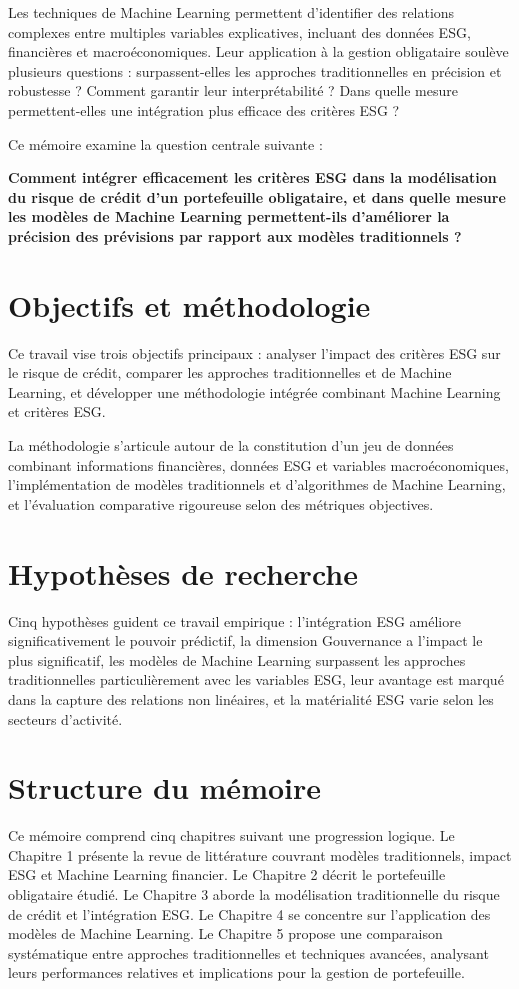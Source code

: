 Les techniques de Machine Learning permettent d'identifier des relations complexes entre multiples variables explicatives, incluant des données ESG, financières et macroéconomiques. Leur application à la gestion obligataire soulève plusieurs questions : surpassent-elles les approches traditionnelles en précision et robustesse ? Comment garantir leur interprétabilité ? Dans quelle mesure permettent-elles une intégration plus efficace des critères ESG ?

Ce mémoire examine la question centrale suivante :

\textbf{Comment intégrer efficacement les critères ESG dans la modélisation du risque de crédit d'un portefeuille obligataire, et dans quelle mesure les modèles de Machine Learning permettent-ils d'améliorer la précision des prévisions par rapport aux modèles traditionnels ?}

\section{Objectifs et méthodologie}

Ce travail vise trois objectifs principaux : analyser l'impact des critères ESG sur le risque de crédit, comparer les approches traditionnelles et de Machine Learning, et développer une méthodologie intégrée combinant Machine Learning et critères ESG.

La méthodologie s'articule autour de la constitution d'un jeu de données combinant informations financières, données ESG et variables macroéconomiques, l'implémentation de modèles traditionnels et d'algorithmes de Machine Learning, et l'évaluation comparative rigoureuse selon des métriques objectives.

\section{Hypothèses de recherche}

Cinq hypothèses guident ce travail empirique : l'intégration ESG améliore significativement le pouvoir prédictif, la dimension Gouvernance a l'impact le plus significatif, les modèles de Machine Learning surpassent les approches traditionnelles particulièrement avec les variables ESG, leur avantage est marqué dans la capture des relations non linéaires, et la matérialité ESG varie selon les secteurs d'activité.

\section{Structure du mémoire}

Ce mémoire comprend cinq chapitres suivant une progression logique. Le Chapitre 1 présente la revue de littérature couvrant modèles traditionnels, impact ESG et Machine Learning financier. Le Chapitre 2 décrit le portefeuille obligataire étudié. Le Chapitre 3 aborde la modélisation traditionnelle du risque de crédit et l'intégration ESG. Le Chapitre 4 se concentre sur l'application des modèles de Machine Learning. Le Chapitre 5 propose une comparaison systématique entre approches traditionnelles et techniques avancées, analysant leurs performances relatives et implications pour la gestion de portefeuille.